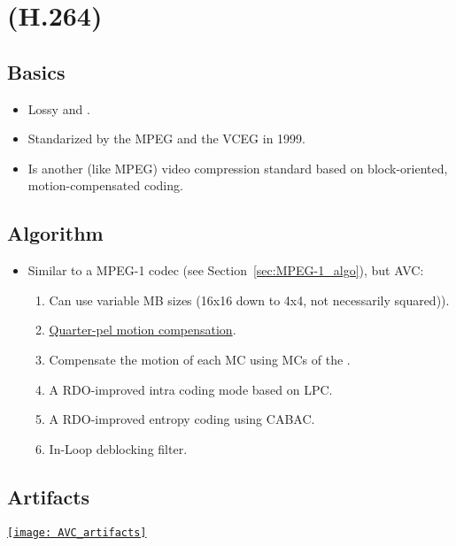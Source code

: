 \chapter{ (H.264)}

\section{Basics}
\begin{itemize}
\item Lossy and  \cite{wikipedia_AVC}.
\item Standarized by the \gls{MPEG} and the \gls{VCEG} in 1999.
\item Is another (like \gls{MPEG}) video compression standard based on
  block-oriented, motion-compensated coding.
\end{itemize}

\section{Algorithm}
\label{sec:MPEG-4_AVC_algo}
\begin{itemize}
\item Similar to a MPEG-1 codec (see Section~\ref{sec:MPEG-1_algo}),
  but \gls{AVC}:
\begin{enumerate}
\item Can use variable MB sizes (16x16 down to 4x4, not
  necessarily squared)).
\item
  \href{https://en.wikipedia.org/wiki/Motion_compensation}{Quarter-pel
    motion compensation}.
\item Compensate the motion of each MC using MCs of the
  .
\item A \gls{RDO}-improved intra coding mode based on \gls{LPC}.
\item A \gls{RDO}-improved entropy coding using \gls{CABAC}.
\item In-Loop deblocking filter.
\end{enumerate}
\end{itemize}

\section{Artifacts}
\begin{center}
  \href{https://www.sciencedirect.com/science/article/pii/B9780124157606000167}{\texttt{[image: AVC\_artifacts]}}
\end{center}
